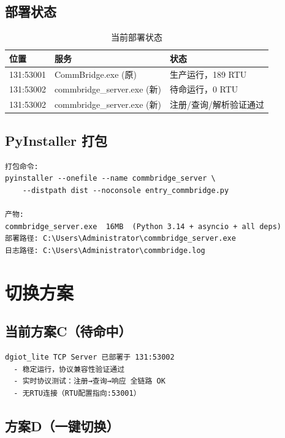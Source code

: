 \documentclass[12pt,a4paper]{ctexart}
\begin{document}
\subsection{部署状态}

\begin{table}[H]\centering
\caption{当前部署状态}
\begin{tabular}{p{3cm}p{5cm}p{4cm}}
\toprule
\textbf{位置} & \textbf{服务} & \textbf{状态} \\
\midrule
131:53001 & CommBridge.exe (原) & 生产运行，189 RTU \\
131:53002 & commbridge\_server.exe (新) & 待命运行，0 RTU \\
131:53002 & commbridge\_server.exe (新) & 注册/查询/解析验证通过 \\
\bottomrule
\end{tabular}
\end{table}

\subsection{PyInstaller 打包}

\begin{lstlisting}
打包命令:
pyinstaller --onefile --name commbridge_server \
    --distpath dist --noconsole entry_commbridge.py

产物:
commbridge_server.exe  16MB  (Python 3.14 + asyncio + all deps)
部署路径: C:\Users\Administrator\commbridge_server.exe
日志路径: C:\Users\Administrator\commbridge.log
\end{lstlisting}

\section{切换方案}

\subsection{当前方案C（待命中）}

\begin{verbatim}
dgiot_lite TCP Server 已部署于 131:53002
  - 稳定运行，协议兼容性验证通过
  - 实时协议测试：注册→查询→响应 全链路 OK
  - 无RTU连接（RTU配置指向:53001）
\end{verbatim}

\subsection{方案D（一键切换）}
\end{document}

